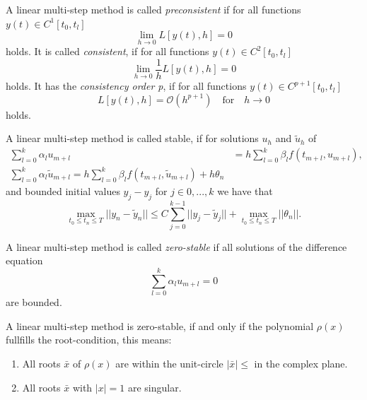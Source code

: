 	\begin{definition}
		A linear multi-step method is called \emph{preconsistent} if for all functions $y(t) \in C^1[t_0,t_l]$
		\begin{displaymath}
			\lim\limits_{h \to 0} L[y(t),h]=0
		\end{displaymath}
		holds. It is called \emph{consistent}, if for all functions $y(t) \in C^2[t_0,t_l]$
		\begin{displaymath}
			\lim\limits_{h \to 0} \frac{1}{h} L[y(t),h] = 0
		\end{displaymath}
		holds. It has the \emph{consistency order p}, if for all functions $y(t) \in C^{p+1}[t_0, t_l]$
		\begin{displaymath}
			L[y(t),h] = \mathcal{O}(h^{p+1}) \quad \text{for} \quad h \to 0
		\end{displaymath}
		holds.
	\end{definition}
	
	\begin{definition} \label{discrete stability LMSM}
		A linear multi-step method is called stable, if for solutions $u_h$ and $\tilde{u}_h$ of
		\begin{align}
			\sum_{l=0}^{k} \alpha_l u_{m+l} &= h \sum_{l=0}^{k} \beta_l f(t_{m+l}, u_{m+l}), \\
			\sum_{l=0}^{k} \alpha_l \tilde{u}_{m+l} = h \sum_{l=0}^{k} \beta_l f(t_{m+l}, \tilde{u}_{m+l}) + h\theta_n
		\end{align} 
		and bounded initial values $y_j - y_j$ for $j \in {0,...,k}$ we have that
		\begin{displaymath}
			\max_{t_0 \leq t_n \leq T} ||y_n - \tilde{y}_n|| \leq C \sum_{j=0}^{k-1} ||y_j - \tilde{y}_j|| + \max_{t_0 \leq t_n \leq T} ||\theta_n||.
		\end{displaymath}
	\end{definition}
	
	\begin{definition}
		A linear multi-step method is called \emph{zero-stable} if all solutions of the difference equation
		\begin{displaymath}
			\sum_{l=0}^{k} \alpha_l u_{m+l} = 0
		\end{displaymath}
		are bounded.
	\end{definition}
	
	\begin{theorem}
		A linear multi-step method is zero-stable, if and only if the polynomial $\rho(x)$ fullfills the root-condition, this means:
		\begin{enumerate}
			\item All roots $\bar{x}$ of $\rho(x)$ are within the unit-circle $|\bar{x}| \leq$ in the complex plane.
			\item All roots $\bar{x}$ with $|x| = 1$ are singular.
		\end{enumerate}
	\end{theorem}
	
